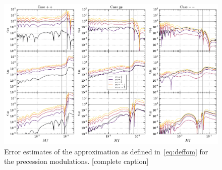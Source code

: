 \documentclass[aps,showpacs,twocolumn,
prd,superscriptaddress,nofootinbib]{revtex4-1}
\newcommand{\SM}[1]{{\color{Red} #1}}
\begin{document}
\begin{figure}
  \centering
  \includegraphics[width=.98\linewidth]{plots/precfom_py.pdf}
  \caption{Error estimates of the approximation as defined in~\eqref{eq:deffom} for the precession modulations. \SM{[complete caption]}}
  \label{fig:fomprec}
\end{figure}

\end{document}
